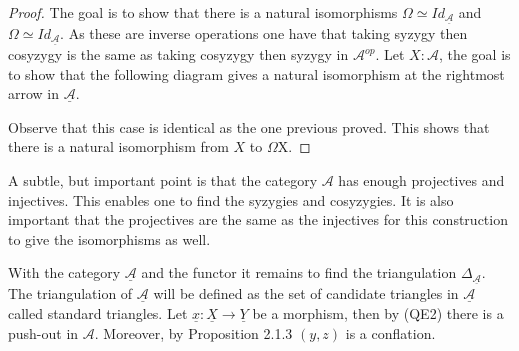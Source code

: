     \begin{proof}
        The goal is to show that there is a natural isomorphisms $\Omega$\upside{$\Omega$}$\simeq Id_{\underline{\mathcal{A}}}$ and \upside{$\Omega$}$\Omega\simeq Id_{\underline{\mathcal{A}}}$. As these are inverse operations one have that taking syzygy then cosyzygy is the same as taking cosyzygy then syzygy in $\mathcal{A}^{op}$.
        Let $X:\mathcal{A}$, the goal is to show that the following diagram gives a natural isomorphism at the rightmost arrow in $\underline{\mathcal{A}}$.
        \begin{center}
        \end{center}
        Observe that this case is identical as the one previous proved. This shows that there is a natural isomorphism from $X$ to \upside{$\Omega$}$\Omega$X.
    \end{proof}

    \begin{remark}
        A subtle, but important point is that the category $\mathcal{A}$ has enough projectives and injectives. This enables one to find the syzygies and cosyzygies. It is also important that the projectives are the same as the injectives for this construction to give the isomorphisms as well.
    \end{remark}

    With the category $\underline{\mathcal{A}}$ and the functor \upside{$\Omega$} it remains to find the triangulation $\Delta_{\underline{\mathcal{A}}}$. The triangulation of $\underline{\mathcal{A}}$ will be defined as the set of candidate triangles in $\underline{\mathcal{A}}$ called standard triangles. Let $\underline{x}:\underline{X}\rightarrow\underline{Y}$ be a morphism, then by (QE2) there is a push-out in $\mathcal{A}$. Moreover, by Proposition 2.1.3 $(y,z)$ is a conflation.


